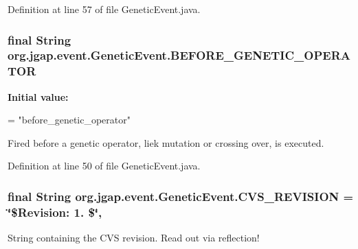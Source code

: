Definition at line 57 of file Genetic\-Event.\-java.

\hypertarget{classorg_1_1jgap_1_1event_1_1_genetic_event_ac2f5a109639d6ce47610900289af86dd}{
\subsubsection[{B\-E\-F\-O\-R\-E\-\_\-\-G\-E\-N\-E\-T\-I\-C\-\_\-\-O\-P\-E\-R\-A\-T\-O\-R}]{\setlength{\rightskip}{0pt plus 5cm}final String org.\-jgap.\-event.\-Genetic\-Event.\-B\-E\-F\-O\-R\-E\-\_\-\-G\-E\-N\-E\-T\-I\-C\-\_\-\-O\-P\-E\-R\-A\-T\-O\-R\hspace{0.3cm}{\ttfamily [static]}}}\label{classorg_1_1jgap_1_1event_1_1_genetic_event_ac2f5a109639d6ce47610900289af86dd}
{\bfseries Initial value\-:}
\begin{DoxyCode}
=
      \textcolor{stringliteral}{"before\_genetic\_operator"}
\end{DoxyCode}
Fired before a genetic operator, liek mutation or crossing over, is executed. 

Definition at line 50 of file Genetic\-Event.\-java.

\hypertarget{classorg_1_1jgap_1_1event_1_1_genetic_event_ae07001087ce2653d2861724f533a4bbc}{
\subsubsection[{C\-V\-S\-\_\-\-R\-E\-V\-I\-S\-I\-O\-N}]{\setlength{\rightskip}{0pt plus 5cm}final String org.\-jgap.\-event.\-Genetic\-Event.\-C\-V\-S\-\_\-\-R\-E\-V\-I\-S\-I\-O\-N = \char`\"{}\$Revision\-: 1. \$\char`\"{}\hspace{0.3cm}{\ttfamily [static]}, {\ttfamily [private]}}}\label{classorg_1_1jgap_1_1event_1_1_genetic_event_ae07001087ce2653d2861724f533a4bbc}
String containing the C\-V\-S revision. Read out via reflection! 

